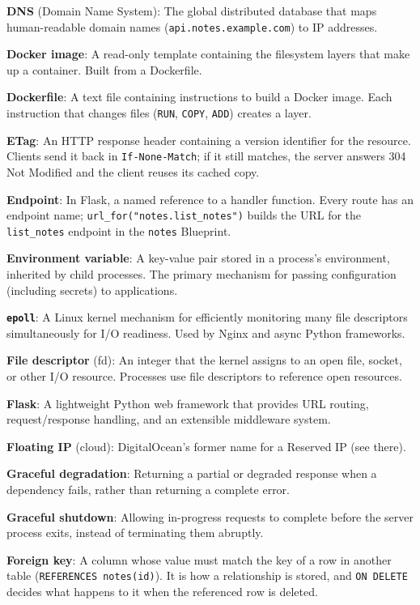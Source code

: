 \textbf{DNS} (Domain Name System): The global distributed database that maps human-readable domain names (\texttt{api.notes.example.com}) to IP addresses.

\textbf{Docker image}: A read-only template containing the filesystem layers that make up a container. Built from a Dockerfile.

\textbf{Dockerfile}: A text file containing instructions to build a Docker image. Each instruction that changes files (\texttt{RUN}, \texttt{COPY}, \texttt{ADD}) creates a layer.

\textbf{ETag}: An HTTP response header containing a version identifier for the resource. Clients send it back in \texttt{If-None-Match}; if it still matches, the server answers 304 Not Modified and the client reuses its cached copy.

\textbf{Endpoint}: In Flask, a named reference to a handler function. Every route has an endpoint name; \texttt{url\_}\allowbreak{}\texttt{for("notes.}\allowbreak{}\texttt{list\_}\allowbreak{}\texttt{notes")} builds the URL for the \texttt{list\_notes} endpoint in the \texttt{notes} Blueprint.

\textbf{Environment variable}: A key-value pair stored in a process's environment, inherited by child processes. The primary mechanism for passing configuration (including secrets) to applications.

\textbf{\texttt{epoll}}: A Linux kernel mechanism for efficiently monitoring many file descriptors simultaneously for I/O readiness. Used by Nginx and async Python frameworks.

\textbf{File descriptor} (fd): An integer that the kernel assigns to an open file, socket, or other I/O resource. Processes use file descriptors to reference open resources.

\textbf{Flask}: A lightweight Python web framework that provides URL routing, request/response handling, and an extensible middleware system.

\textbf{Floating IP} (cloud): DigitalOcean's former name for a Reserved IP (see there).

\textbf{Graceful degradation}: Returning a partial or degraded response when a dependency fails, rather than returning a complete error.

\textbf{Graceful shutdown}: Allowing in-progress requests to complete before the server process exits, instead of terminating them abruptly.

\textbf{Foreign key}: A column whose value must match the key of a row in another table (\texttt{REFERENCES\ notes(id)}). It is how a relationship is stored, and \texttt{ON\ DELETE} decides what happens to it when the referenced row is deleted.

